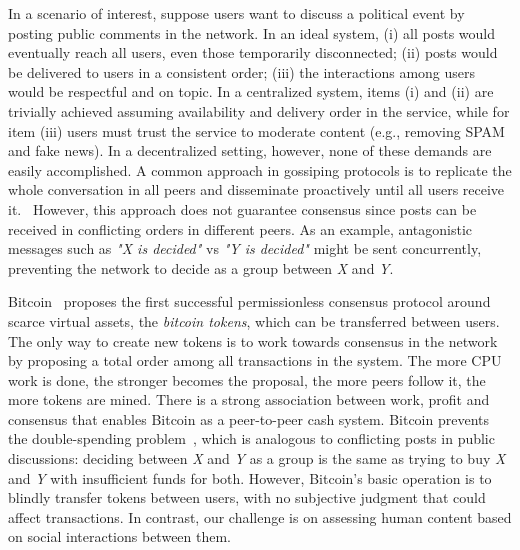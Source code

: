 \documentclass[10pt,journal,compsoc]{IEEEtran}
\begin{document}
In a scenario of interest, suppose users want to discuss a political event by
posting public comments in the network.
In an ideal system,
(i)   all posts would eventually reach all users, even those temporarily
      disconnected;
(ii)  posts would be delivered to users in a consistent order;
(iii) the interactions among users would be respectful and on topic.
In a centralized system, items (i) and (ii) are trivially achieved assuming
availability and delivery order in the service, while for item (iii) users must
trust the service to moderate content (e.g., removing SPAM and fake news).
In a decentralized setting, however, none of these demands are easily
accomplished.
A common approach in gossiping protocols is to replicate the whole conversation
in all peers and disseminate proactively until all users receive
it.~\cite{p2p.survey}
However, this approach does not guarantee consensus since posts can be received
in conflicting orders in different peers.
As an example, antagonistic messages such as \emph{"X is decided"} vs
\emph{"Y is decided"} might be sent concurrently, preventing the network to
decide as a group between \emph{X} and \emph{Y}.

Bitcoin~\cite{p2p.bitcoin} proposes the first successful permissionless
consensus protocol around scarce virtual assets, the \emph{bitcoin tokens},
which can be transferred between users.
%
The only way to create new tokens is to work towards consensus in the network
by proposing a total order among all transactions in the system.
The more CPU work is done, the stronger becomes the proposal, the more peers
follow it, the more tokens are mined.
There is a strong association between work, profit and consensus that enables
Bitcoin as a peer-to-peer cash system.
%
Bitcoin prevents the double-spending problem~\cite{p2p.bitcoin}, which is
analogous to conflicting posts in public discussions: deciding between \emph{X}
and \emph{Y} as a group is the same as trying to buy \emph{X} and \emph{Y} with
insufficient funds for both.
%
However, Bitcoin's basic operation is to blindly transfer tokens between users,
with no subjective judgment that could affect transactions.
In contrast, our challenge is on assessing human content based on social
interactions between them.
\end{document}
